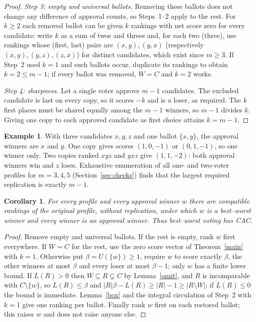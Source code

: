 \documentclass[11pt,a4paper]{article}
\newtheorem{corollary}[theorem]{Corollary}
\theoremstyle{definition}
\newtheorem{example}[theorem]{Example}
\theoremstyle{remark}
\begin{document}
\begin{proof}
\emph{Step 3: empty and universal ballots.} Removing these ballots does not change any difference of approval counts, so Steps~1--2 apply to the rest. For $k\ge2$ each removed ballot can be given $k$ rankings with net score zero for every candidate: write $k$ as a sum of twos and threes and, for each two (three), use rankings whose (first, last) pairs are $(x,y),(y,x)$ (respectively $(x,y),(y,z),(z,x)$) for distinct candidates, which exist since $m\ge3$. If Step~2 used $k=1$ and such ballots occur, duplicate its rankings to obtain $k=2\le m-1$; if every ballot was removed, $W=C$ and $k=2$ works.

\emph{Step 4: sharpness.} Let a single voter approve $m-1$ candidates. The excluded candidate is last on every copy, so it scores $-k$ and is a loser, as required. The $k$ first places must be shared equally among the $m-1$ winners, so $m-1$ divides $k$. Giving one copy to each approved candidate as first choice attains $k=m-1$.
\end{proof}

\begin{example}
With three candidates $x,y,z$ and one ballot $\{x,y\}$, the approval winners are $x$ and $y$. One copy gives scores $(1,0,-1)$ or $(0,1,-1)$, so one winner only. Two copies ranked $xyz$ and $yxz$ give $(1,1,-2)$: both approval winners win and $z$ loses. Exhaustive enumeration of all one- and two-voter profiles for $m=3,4,5$ (Section~\ref{sec:checks}) finds that the largest required replication is exactly $m-1$.
\end{example}

\begin{corollary}\label{cac}
For every profile and every approval winner $w$ there are compatible rankings of the original profile, without replication, under which $w$ is a best--worst winner and every winner is an approval winner. Thus best--worst voting has CAC.
\end{corollary}
\begin{proof}
Remove empty and universal ballots. If the rest is empty, rank $w$ first everywhere. If $W=C$ for the rest, use the zero score vector of Theorem~\ref{main} with $k=1$. Otherwise put $\beta=U(\{w\})\ge1$, require $w$ to score exactly $\beta$, the other winners at most $\beta$ and every loser at most $\beta-1$; only $w$ has a finite lower bound. If $L(R)>0$ then $W\subseteq R\subsetneq C$ by Lemma~\ref{omit}, and $R$ is incomparable with $C\setminus\{w\}$, so $L(R)\le\beta$ and $|R|\beta-L(R)\ge|R|-1\ge|R\setminus W|$; if $L(R)\le0$ the bound is immediate. Lemma~\ref{box} and the integral circulation of Step~2 with $k=1$ give one ranking per ballot. Finally rank $w$ first on each restored ballot; this raises $w$ and does not raise anyone else.
\end{proof}
\end{document}
